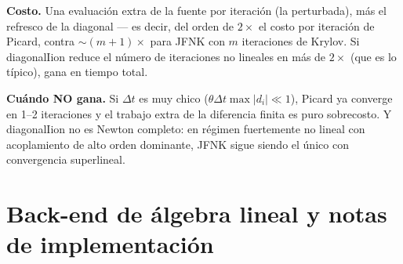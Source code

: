 \documentclass[11pt,a4paper]{article}
\begin{document}
\textbf{Costo.} Una evaluación extra de la fuente por iteración (la perturbada), más el refresco de la diagonal — es decir, del orden de $2\times$ el costo por iteración de Picard, contra $\sim(m+1)\times$ para JFNK con $m$ iteraciones de Krylov. Si diagonalIion reduce el número de iteraciones no lineales en más de $2\times$ (que es lo típico), gana en tiempo total.

\textbf{Cuándo NO gana.} Si $\Delta t$ es muy chico ($\theta\Delta t\max|d_i|\ll1$), Picard ya converge en 1–2 iteraciones y el trabajo extra de la diferencia finita es puro sobrecosto. Y diagonalIion no es Newton completo: en régimen fuertemente no lineal con acoplamiento de alto orden dominante, JFNK sigue siendo el único con convergencia superlineal.



\section{Back-end de álgebra lineal y notas de implementación}
\label{sec:linear-backend}
\end{document}

